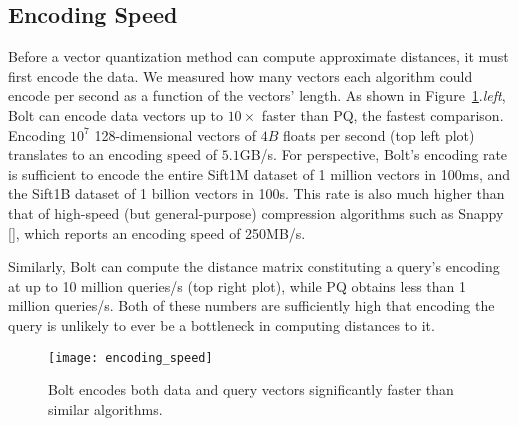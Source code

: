 

\subsection{Encoding Speed}
Before a vector quantization method can compute approximate distances, it must first encode the data. We measured how many vectors each algorithm could encode per second as a function of the vectors' length. As shown in Figure~\ref{fig:encoding_speeds}.\textit{left}, Bolt can encode data vectors up to $10\times$ faster than PQ, the fastest comparison. Encoding $10^7$ 128-dimensional vectors of $4B$ floats per second (top left plot) translates to an encoding speed of $5.1$GB/s. For perspective, Bolt's encoding rate is sufficient to encode the entire Sift1M dataset of 1 million vectors in 100ms, and the Sift1B dataset of 1 billion vectors in 100s. This rate is also much higher than that of high-speed (but general-purpose) compression algorithms such as Snappy [], which reports an encoding speed of 250MB/s.

Similarly, Bolt can compute the distance matrix constituting a query's encoding at up to 10 million queries/s (top right plot), while PQ obtains less than 1 million queries/s. Both of these numbers are sufficiently high that encoding the query is unlikely to ever be a bottleneck in computing distances to it.

\begin{figure}[h]
\begin{center}
\label{fig:encoding_speeds}
\texttt{[image: encoding\_speed]}
\vspace*{-1mm}
\caption{Bolt encodes both data and query vectors significantly faster than similar algorithms.}
\end{center}
\end{figure}

